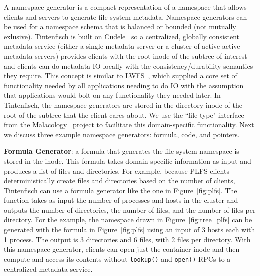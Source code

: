 A namespace generator is a compact representation of a namespace that allows
clients and servers to generate file system metadata.  Namespace generators can
be used for a namespace schema that is balanced or bounded (not mutually
exlusive).  Tintenfisch is built on Cudele~\cite{sevilla:ipdps18-cudele} so a
centralized, globally consistent metadata service (either a single metadata
server or a cluster of active-active metadata servers) provides clients with
the root inode of the subtree of interest and clients can do metadata IO
locally with the consistency/durability semantics they require. This concept is
similar to LWFS~\cite{oldfield:cc06-lwfs}, which supplied a core set of
functionality needed by all applications needing to do IO with the assumption
that applications would bolt-on any functionality they needed later.  In Tintenfisch,
the namespace generators are stored in the directory inode of the root of the
subtree that the client cares about. We use the ``file type" interface from the
Malacology~\cite{sevilla:eurosys17-malacology} project to facilitate this
domain-specific functionality.  Next we discuss three example namespace
generators: formula, code, and pointers.


\textbf{Formula Generator}: a formula that generates the file system namespace
is stored in the inode. This formula takes domain-specific information as input
and produces a list of files and directories.  For example, because PLFS
clients deterministically create files and directories based on the number of
clients, Tintenfisch can use a formula generator like the one in
Figure~\ref{fig:plfs}. The function takes as input the number of processes and
hosts in the cluster and outputs the number of directories, the number of
files, and the number of files per directory.  For the example, the namespace
drawn in Figure~\ref{fig:tree_plfs} can be generated with the formula in
Figure~\ref{fig:plfs} using an input of 3 hosts each with 1 process. The output
is 3 directories and 6 files, with 2 files per directory.  With this namespace
generator, clients can open just the container inode and then compute and
access its contents without \texttt{lookup()} and \texttt{open()} RPCs to a
centralized metadata service.

